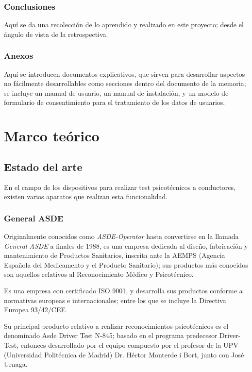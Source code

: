 \documentclass[12pt,a4paper,twoside,openright]{book}
\begin{document}
\subsection{Conclusiones}

Aquí se da una recolección de lo aprendido y realizado en este proyecto; desde el ángulo de vista de la retrospectiva.

\subsection{Anexos}

Aquí se introducen documentos explicativos, que sirven para desarrollar aspectos no fácilmente desarrollables como secciones dentro del documento de la memoria; se incluye un manual de usuario, un manual de instalación, y un modelo de formulario de consentimiento para el tratamiento de los datos de usuarios.

\chapter{Marco teórico}
\section{Estado del arte}

En el campo de los dispositivos para realizar test psicotécnicos a conductores, existen varios
aparatos que realizan esta funcionalidad.

\subsection{General ASDE}

Originalmente conocidos como \textit{ASDE-Operator} hasta convertirse en la llamada \textit{General ASDE} a finales de 1988\cite{commodorearticle}, es una empresa dedicada al diseño, fabricación y mantenimiento de Productos Sanitarios, inscrita ante la AEMPS (Agencia Española del Medicamento y el Producto Sanitario); sus productos más conocidos son aquellos relativos al Reconocimiento Médico y Psicotécnico.

Es una empresa con certificado ISO 9001, y desarrolla sus productos conforme a normativas europeas e internacionales; entre los que se incluye la Directiva Europea 93/42/CEE\cite{asde1}

Su principal producto relativo a realizar reconocimientos psicotécnicos es el denominado Asde Driver Test N-845; basado en el programa predecesor Driver-Test, entonces desarrollado por el equipo compuesto por el profesor de la UPV (Universidad Politécnica de Madrid) Dr. Héctor Monterde i Bort, junto con José Urnaga.\cite{asde2}
\end{document}
